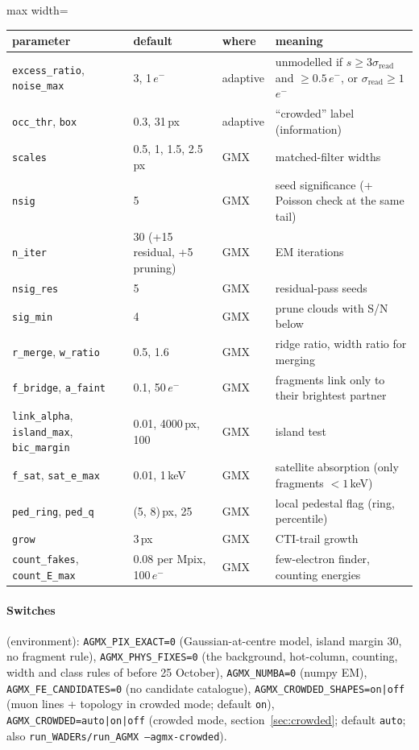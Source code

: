 \documentclass[11pt,a4paper]{article}
\newcommand{\el}{\ensuremath{e^-}}
\newcommand{\code}[1]{\texttt{#1}}
\begin{document}
\begin{table}[H]\centering\small
\begin{adjustbox}{max width=\linewidth}
\begin{tabular}{llll}
\toprule
parameter & default & where & meaning \\
\midrule
\code{excess\_ratio}, \code{noise\_max} & 3, 1\,\el & adaptive & unmodelled if $s\ge3\sigma_\mathrm{read}$ and $\ge0.5$\,\el, or $\sigma_\mathrm{read}\ge1$\,\el \\
\code{occ\_thr}, \code{box} & 0.3, 31\,px & adaptive & ``crowded'' label (information) \\
\code{scales} & 0.5, 1, 1.5, 2.5\,px & GMX & matched-filter widths \\
\code{nsig} & 5 & GMX & seed significance (+ Poisson check at the same tail) \\
\code{n\_iter} & 30 (+15 residual, +5 pruning) & GMX & EM iterations \\
\code{nsig\_res} & 5 & GMX & residual-pass seeds \\
\code{sig\_min} & 4 & GMX & prune clouds with S/N below \\
\code{r\_merge}, \code{w\_ratio} & 0.5, 1.6 & GMX & ridge ratio, width ratio for merging \\
\code{f\_bridge}, \code{a\_faint} & 0.1, 50\,\el & GMX & fragments link only to their brightest partner \\
\code{link\_alpha}, \code{island\_max}, \code{bic\_margin} & 0.01, 4000\,px, 100 & GMX & island test \\
\code{f\_sat}, \code{sat\_e\_max} & 0.01, 1\,keV & GMX & satellite absorption (only fragments $<1$\,keV) \\
\code{ped\_ring}, \code{ped\_q} & (5, 8)\,px, 25 & GMX & local pedestal flag (ring, percentile) \\
\code{grow} & 3\,px & GMX & CTI-trail growth \\
\code{count\_fakes}, \code{count\_E\_max} & 0.08 per Mpix, 100\,\el & GMX & few-electron finder, counting energies \\
\bottomrule
\end{tabular}
\end{adjustbox}
\end{table}

\paragraph{Switches} (environment): \code{AGMX\_PIX\_EXACT=0} (Gaussian-at-centre model, island margin 30, no fragment rule),
\code{AGMX\_PHYS\_FIXES=0} (the background, hot-column, counting, width and class rules of before 25 October),
\code{AGMX\_NUMBA=0} (numpy EM), \code{AGMX\_FE\_CANDIDATES=0} (no candidate catalogue),
\code{AGMX\_CROWDED\_SHAPES=on|off} (muon lines + topology in crowded mode; default \code{on}),
\code{AGMX\_CROWDED=auto|on|off} (crowded mode, section~\ref{sec:crowded}; default \code{auto}; also
\code{run\_WADERs/run\_AGMX --agmx-crowded}).
\end{document}
